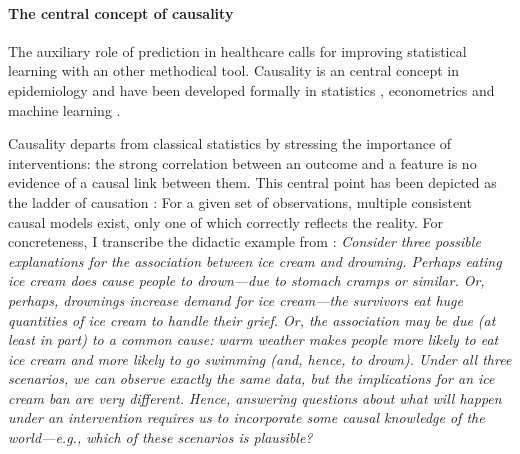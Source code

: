 \documentclass[french,12pt,twoside,a4paper]{book}
\begin{document}
\begin{background_box_left}



  \paragraph{The central concept of causality}%
  \label{subsec:intro:causation}%

  The auxiliary role of prediction in healthcare calls for improving statistical
  learning with an other methodical tool. Causality is an central concept in
  epidemiology \citep{hill1965environment,hernan2020causal} and have been
  developed formally in statistics \citep{rubin1974estimating}, econometrics
  \citep{imbens2009recent} and machine learning \citep{pearl2018book}.

  Causality departs from classical statistics by stressing the importance of
  interventions: the strong correlation between an outcome and a feature is no
  evidence of a causal link between them. This central point has been depicted
  as the ladder of causation \citep{pearl2018book}: For a given set of
  observations, multiple consistent causal models exist, only one of which
  correctly reflects the reality. For concreteness, I transcribe the didactic
  example from \cite{murphy2022probabilistic_chapter36}: \textit{Consider three
    possible explanations for the association between ice cream and drowning.
    Perhaps eating ice cream does cause people to drown—due to stomach cramps or
    similar. Or, perhaps, drownings increase demand for ice cream—the survivors
    eat huge quantities of ice cream to handle their grief. Or, the association
    may be due (at least in part) to a common cause: warm weather makes people
    more likely to eat ice cream and more likely to go swimming (and, hence, to
    drown). Under all three scenarios, we can observe exactly the same data, but
    the implications for an ice cream ban are very different. Hence, answering
    questions about what will happen under an intervention requires us to
    incorporate some causal knowledge of the world—e.g., which of these scenarios
    is plausible?}


\end{background_box_left}
\end{document}
